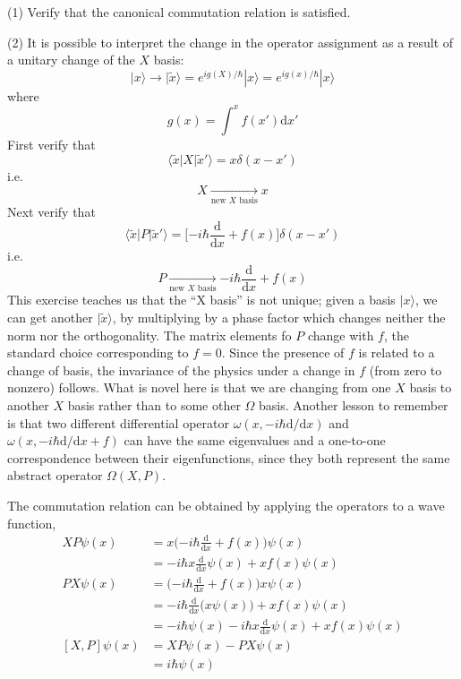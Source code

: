 \documentclass[../principles-of-quantum-mechanics.tex]{subfiles}
\begin{document}
\begin{questions}
		(1) Verify that the canonical commutation relation is satisfied.
		
		(2) It is possible to interpret the change in the operator assignment as a result of a unitary change of the $X$ basis:
		$$|x\rangle \to |\tilde{x}\rangle = e^{ig(X)/\hbar}|x\rangle = e^{ig(x)/\hbar}|x\rangle$$
		where
		$$g(x) = \int^xf(x')\mathrm{d}x'$$
		First verify that
		$$\langle \tilde{x}|X|\tilde{x}'\rangle = x\delta(x - x')$$
		i.e.
		$$X \xrightarrow[\text{new }X\text{ basis}]{} x$$
		Next verify that
		$$\langle \tilde{x}|P|\tilde{x}'\rangle = \Big[{-i\hbar\frac{\mathrm{d}}{\mathrm{d}x} + f(x)}\Big]\delta(x - x')$$
		i.e.
		$$P \xrightarrow[\text{new }X\text{ basis}]{} {-i\hbar\frac{\mathrm{d}}{\mathrm{d}x}} + f(x)$$
		This exercise teaches us that the ``X basis'' is not unique; given a basis $|x\rangle$, we can get another $|\tilde{x}\rangle$, by multiplying by a phase factor which changes neither the norm nor the orthogonality. The matrix elements fo $P$ change with $f$, the standard choice corresponding to $f = 0$. Since the presence of $f$ is related to a change of basis, the invariance of the physics under a change in $f$ (from zero to nonzero) follows. What is novel here is that we are changing from one $X$ basis to another $X$ basis rather than to some other $\Omega$ basis. Another lesson to remember is that two different differential operator $\omega(x, {-i\hbar\mathrm{d}/\mathrm{d}x})$ and $\omega(x, {-i\hbar\mathrm{d}/\mathrm{d}x} + f)$ can have the same eigenvalues and a one-to-one correspondence between their eigenfunctions, since they both represent the same abstract operator $\Omega(X, P)$.
		\begin{solution}
			The commutation relation can be obtained by applying the operators to a wave function,
			\begin{align*}
				XP\psi(x) &= x\Big({-i\hbar\frac{\mathrm{d}}{\mathrm{d}x}} + f(x)\Big)\psi(x) \\
				&= -i\hbar x\frac{\mathrm{d}}{\mathrm{d}x}\psi(x) + xf(x)\psi(x) \\
				PX\psi(x) &= \Big({-i\hbar\frac{\mathrm{d}}{\mathrm{d}x}} + f(x)\Big)x\psi(x) \\
				&= -i\hbar\frac{\mathrm{d}}{\mathrm{d}x}\big(x\psi(x)\big) + xf(x)\psi(x) \\
				&= -i\hbar\psi(x) - i\hbar x\frac{\mathrm{d}}{\mathrm{d}x}\psi(x) + xf(x)\psi(x) \\
				[X, P]\psi(x) &= XP\psi(x) - PX\psi(x) \\
				&= i\hbar\psi(x)
			\end{align*}

\end{solution}
\end{questions}
\end{document}
